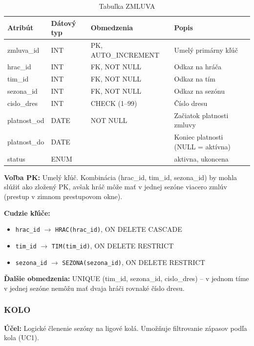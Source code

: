 \documentclass[11pt, a4paper]{article}
\begin{document}
\begin{table}[H]
    \centering
    \caption{Tabuľka ZMLUVA}
    \label{tab:zmluva}
    \begin{tabular}{l l l l}
        \toprule
        \textbf{Atribút} & \textbf{Dátový typ} & \textbf{Obmedzenia} & \textbf{Popis} \\
        \midrule
        zmluva\_id   & INT  & PK, AUTO\_INCREMENT & Umelý primárny kľúč \\
        hrac\_id     & INT  & FK, NOT NULL        & Odkaz na hráča \\
        tim\_id      & INT  & FK, NOT NULL        & Odkaz na tím \\
        sezona\_id   & INT  & FK, NOT NULL        & Odkaz na sezónu \\
        cislo\_dres  & INT  & CHECK (1--99)       & Číslo dresu \\
        platnost\_od & DATE & NOT NULL            & Začiatok platnosti zmluvy \\
        platnost\_do & DATE &                     & Koniec platnosti (NULL = aktívna) \\
        status       & ENUM &                     & aktivna, ukoncena \\
        \bottomrule
    \end{tabular}
\end{table}

\textbf{Voľba PK:} Umelý kľúč. Kombinácia (hrac\_id, tim\_id, sezona\_id) by mohla slúžiť ako zložený PK, avšak hráč môže mať v jednej sezóne viacero zmlúv (prestup v zimnom prestupovom okne).

\textbf{Cudzie kľúče:}
\begin{itemize}
    \item \texttt{hrac\_id} $\rightarrow$ \texttt{HRAC(hrac\_id)}, ON DELETE CASCADE
    \item \texttt{tim\_id} $\rightarrow$ \texttt{TIM(tim\_id)}, ON DELETE RESTRICT
    \item \texttt{sezona\_id} $\rightarrow$ \texttt{SEZONA(sezona\_id)}, ON DELETE RESTRICT
\end{itemize}

\textbf{Ďalšie obmedzenia:} UNIQUE (tim\_id, sezona\_id, cislo\_dres) -- v jednom tíme v jednej sezóne nemôžu mať dvaja hráči rovnaké číslo dresu.

\subsubsection{KOLO}
\textbf{Účel:} Logické členenie sezóny na ligové kolá. Umožňuje filtrovanie zápasov podľa kola (UC1).
\end{document}
